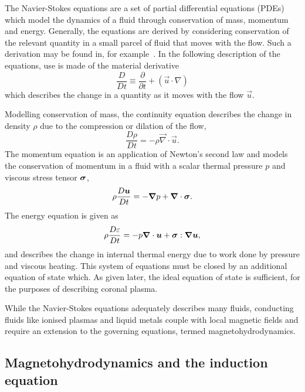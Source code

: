 The Navier-Stokes equations are a set of partial differential equations (PDEs) which model the dynamics of a fluid through conservation of mass, momentum and energy. Generally, the equations are derived by considering conservation of the relevant quantity in a small parcel of fluid that moves with the flow. Such a derivation may be found in, for example~\cite{andersonComputationalFluidDynamics1995}. In the following description of the equations, use is made of the material derivative
\begin{equation}
  \label{eq:material_derivative}
  \frac{D}{Dt} \equiv \frac{\partial}{\partial t} + (\vec{u} \cdot \nabla)
\end{equation}
which describes the change in a quantity as it moves with the flow $\vec{u}$.

Modelling conservation of mass, the continuity equation describes the change in density $\rho$ due to the compression or dilation of the flow,
\begin{equation}
\frac{D\rho}{Dt} = - \rho \vec{\nabla} \cdot \vec{u}.
\label{eq:ns_continuity}
\end{equation}
The momentum equation is an application of Newton's second law and models the conservation of momentum in a fluid with a scalar thermal pressure $p$ and viscous stress tensor ${\bm \sigma}$,
\begin{equation}
\rho\frac{D{\bm u}}{Dt} = -{\bm \nabla} p + {\bm \nabla} \cdot {\bm \sigma}.
\label{eq:ns_momentum}
\end{equation}
The energy equation is given as
\begin{equation}
\rho\frac{D\varepsilon}{Dt} = -p {\bm \nabla} \cdot {\bm u} + {\bm \sigma} : {\bm \nabla}{\bm u},
\label{eq:ns_energy}
\end{equation}
and describes the change in internal thermal energy due to work done by pressure and viscous heating. This system of equations must be closed by an additional equation of state which. As given later, the ideal equation of state is sufficient, for the purposes of describing coronal plasma.

While the Navier-Stokes equations adequately describes many fluids, conducting fluids like ionised plasmas and liquid metals couple with local magnetic fields and require an extension to the governing equations, termed magnetohydrodynamics.

\subsection{Magnetohydrodynamics and the induction equation}

